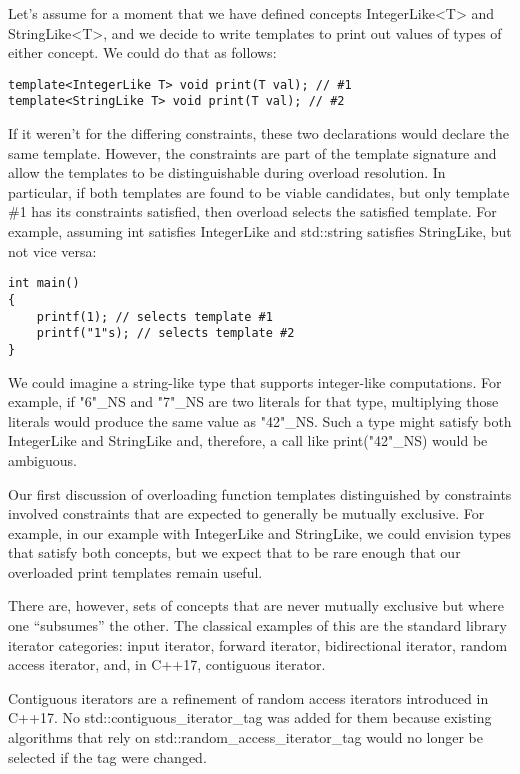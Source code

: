 
Let’s assume for a moment that we have defined concepts IntegerLike<T> and StringLike<T>, and we decide to write templates to print out values of types of either concept. We could do that as follows:

\begin{lstlisting}[style=styleCXX]
template<IntegerLike T> void print(T val); // #1
template<StringLike T> void print(T val); // #2
\end{lstlisting}

If it weren’t for the differing constraints, these two declarations would declare the same template. However, the constraints are part of the template signature and allow the templates to be distinguishable during overload resolution. In particular, if both templates are found to be viable candidates, but only template \#1 has its constraints satisfied, then overload selects the satisfied template. For example, assuming int satisfies IntegerLike and std::string satisfies StringLike, but not vice versa:

\begin{lstlisting}[style=styleCXX]
int main()
{
	printf(1); // selects template #1
	printf("1"s); // selects template #2
}
\end{lstlisting}

We could imagine a string-like type that supports integer-like computations. For example, if "6"\_NS and "7"\_NS are two literals for that type, multiplying those literals would produce the same value as "42"\_NS. Such a type might satisfy both IntegerLike and StringLike and, therefore, a call like print("42"\_NS) would be ambiguous.


Our first discussion of overloading function templates distinguished by constraints involved constraints that are expected to generally be mutually exclusive. For example, in our example with IntegerLike and StringLike, we could envision types that satisfy both concepts, but we expect that to be rare enough that our overloaded print templates remain useful.

There are, however, sets of concepts that are never mutually exclusive but where one “subsumes” the other. The classical examples of this are the standard library iterator categories: input iterator, forward iterator, bidirectional iterator, random access iterator, and, in C++17, contiguous iterator.

\begin{tcolorbox}[colback=webgreen!5!white,colframe=webgreen!75!black]
\hspace*{0.75cm}Contiguous iterators are a refinement of random access iterators introduced in C++17. No std::contiguous\_iterator\_tag was added for them because existing algorithms that rely on std::random\_access\_iterator\_tag would no longer be selected if the tag were changed.
\end{tcolorbox}

